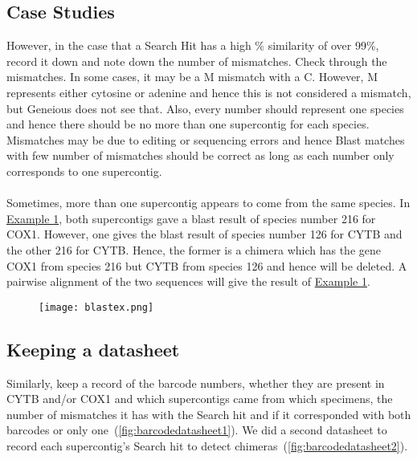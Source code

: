 \documentclass[11pt]{article}
\newcommand{\exautoref}[1]{\hyperref[#1]{Example \ref*{#1}}}
\begin{document}
\subsection{Case Studies}
However, in the case that a Search Hit has a high \% similarity of over 99\%, record it down and note down the number of mismatches. Check through the mismatches. In some cases, it may be a M mismatch with a C. However, M represents either cytosine or adenine and hence this is not considered a mismatch, but Geneious does not see that. Also, every number should represent one species and hence there should be no more than one supercontig for each species. Mismatches may be due to editing or sequencing errors and hence Blast matches with few number of mismatches should be correct as long as each number only corresponds to one supercontig.
\\
\\
Sometimes, more than one supercontig appears to come from the same species. In \exautoref{fig:blastex}, both supercontigs gave a blast result of species number 216 for COX1. However, one gives the blast result of species number 126 for CYTB and the other 216 for CYTB. Hence, the former is a chimera which has the gene COX1 from species 216 but CYTB from species 126 and hence will be deleted. A pairwise alignment of the two sequences will give the result of \exautoref{fig:blastex}.

\begin{figure}[H]
  \centering
    \texttt{[image: blastex.png]}
  \label{fig:blastex}
\end{figure}

\subsection{Keeping a datasheet}
Similarly, keep a record of the barcode numbers, whether they are present in CYTB and/or COX1 and which supercontigs came from which specimens, the number of mismatches it has with the Search hit and if it corresponded with both barcodes or only one~(\autoref{fig:barcodedatasheet1}). We did a second datasheet to record each supercontig's Search hit to detect chimeras~(\autoref{fig:barcodedatasheet2}).

\begin{figure}[H]
   \label{fig:barcodedatasheet1}\label{fig:barcodedatasheet2}
\end{figure}
\end{document}
